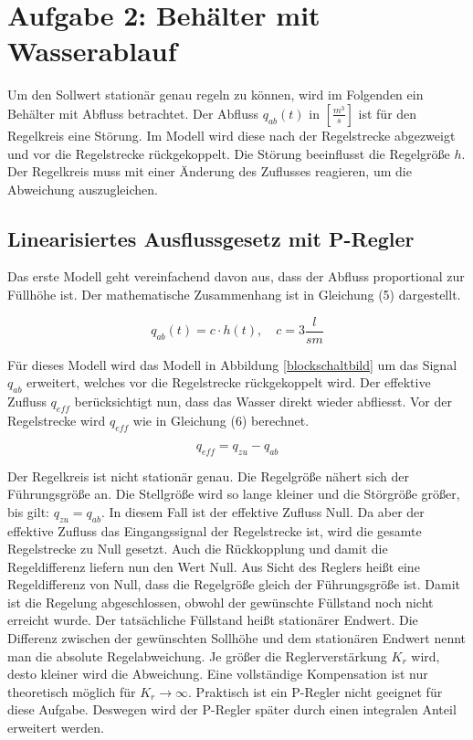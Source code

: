 \section{Aufgabe 2: Behälter mit Wasserablauf}
Um den Sollwert stationär genau regeln zu können, wird im Folgenden ein Behälter mit Abfluss betrachtet. Der Abfluss $q_{ab}(t)$ in $[\frac{m^3}{s}]$ ist für den Regelkreis eine Störung. Im Modell wird diese nach der Regelstrecke abgezweigt und vor die Regelstrecke rückgekoppelt. Die Störung beeinflusst die Regelgröße $h$. Der Regelkreis muss mit einer Änderung des Zuflusses reagieren, um die Abweichung auszugleichen. 

\subsection{Linearisiertes Ausflussgesetz mit P-Regler}
Das erste Modell geht vereinfachend davon aus, dass der Abfluss proportional zur Füllhöhe ist. Der mathematische Zusammenhang ist in Gleichung (5) dargestellt.

\begin{equation}
    q_{ab}(t)= c \cdot h(t), \quad c=3\frac{l}{sm}
\end{equation}

Für dieses Modell wird das Modell in Abbildung \ref{blockschaltbild} um das Signal $q_{ab}$ erweitert, welches vor die Regelstrecke rückgekoppelt wird. Der effektive Zufluss $q_{eff}$ berücksichtigt nun, dass das Wasser direkt wieder abfliesst. Vor der Regelstrecke wird $q_{eff}$ wie in Gleichung (6) berechnet.

\begin{equation}
    q_{eff}=q_{zu}-q_{ab}
\end{equation}

Der Regelkreis ist nicht stationär genau. Die Regelgröße nähert sich der Führungsgröße an. Die Stellgröße wird so lange kleiner und die Störgröße größer, bis gilt: $q_{zu} = q_{ab}$. In diesem Fall ist der effektive Zufluss Null. Da aber der effektive Zufluss das Eingangssignal der Regelstrecke ist, wird die gesamte Regelstrecke zu Null gesetzt. Auch die Rückkopplung und damit die Regeldifferenz liefern nun den Wert Null. Aus Sicht des Reglers heißt eine Regeldifferenz von Null, dass die Regelgröße gleich der Führungsgröße ist. Damit ist die Regelung abgeschlossen, obwohl der gewünschte Füllstand noch nicht erreicht wurde. Der tatsächliche Füllstand heißt stationärer Endwert. Die Differenz zwischen der gewünschten Sollhöhe und dem stationären Endwert nennt man die absolute Regelabweichung. Je größer die Reglerverstärkung $K_r$ wird, desto kleiner wird die Abweichung. Eine vollständige Kompensation ist nur theoretisch möglich für $K_r \to \infty$. Praktisch ist ein P-Regler nicht geeignet für diese Aufgabe. Deswegen wird der P-Regler später durch einen integralen Anteil erweitert werden.

